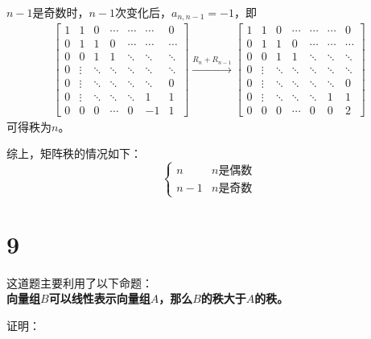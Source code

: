 \documentclass{article}
\begin{document}
$n - 1$是奇数时，$n - 1$次变化后，$a_{n, n - 1} = -1$，即
\begin{align*}
  \begin{bmatrix}
    1 & 1      & 0      & \cdots & \cdots & \cdots & 0      \\
    0 & 1      & 1      & 0      & \cdots & \cdots & \cdots \\
    0 & 0      & 1      & 1      & \ddots & \ddots & \ddots \\
    0 & \vdots & \ddots & \ddots & \ddots & \ddots & \ddots \\
    0 & \vdots & \ddots & \ddots & \ddots & \ddots & 0      \\
    0 & \vdots & \ddots & \ddots & \ddots & 1      & 1      \\
    0 & 0      & 0      & \cdots & 0      & -1     & 1
  \end{bmatrix}
  \xrightarrow{R_n + R_{n - 1}}
  \begin{bmatrix}
    1 & 1      & 0      & \cdots & \cdots & \cdots & 0      \\
    0 & 1      & 1      & 0      & \cdots & \cdots & \cdots \\
    0 & 0      & 1      & 1      & \ddots & \ddots & \ddots \\
    0 & \vdots & \ddots & \ddots & \ddots & \ddots & \ddots \\
    0 & \vdots & \ddots & \ddots & \ddots & \ddots & 0      \\
    0 & \vdots & \ddots & \ddots & \ddots & 1      & 1      \\
    0 & 0      & 0      & \cdots & 0      & 0      & 2
  \end{bmatrix}
\end{align*}
可得秩为$n$。

综上，矩阵秩的情况如下：
\begin{equation*}
  \begin{cases*}
    n     & n \text{是偶数} \\
    n - 1 & n \text{是奇数}
  \end{cases*}
\end{equation*}

\section*{9}
这道题主要利用了以下命题：\\
\textbf{向量组$B$可以线性表示向量组$A$，那么$B$的秩大于$A$的秩。}

证明：
\end{document}
